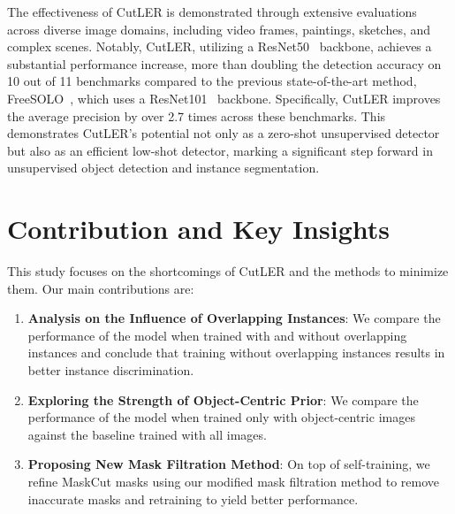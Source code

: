 The effectiveness of CutLER is demonstrated through extensive evaluations across diverse image domains, including video frames, paintings, sketches, and complex scenes. Notably, CutLER, utilizing a ResNet50~\cite{he2015deepresiduallearningimage} backbone, achieves a substantial performance increase, more than doubling the detection accuracy on 10 out of 11 benchmarks compared to the previous state-of-the-art method, FreeSOLO~\cite{wang2022freesolo}, which uses a ResNet101~\cite{he2015deepresiduallearningimage} backbone. Specifically, CutLER improves the average precision by over 2.7 times across these benchmarks. This demonstrates CutLER's potential not only as a zero-shot unsupervised detector but also as an efficient low-shot detector, marking a significant step forward in unsupervised object detection and instance segmentation.

\section{Contribution and Key Insights}

This study focuses on the shortcomings of CutLER and the methods to minimize them. Our main contributions are:

\begin{enumerate}
    
    \item \textbf{Analysis on the Influence of Overlapping Instances}: We compare the performance of the model when trained with and without overlapping instances and conclude that training without overlapping instances results in better instance discrimination.
    
    \item \textbf{Exploring the Strength of Object-Centric Prior}: We compare the performance of the model when trained only with object-centric images against the baseline trained with all images.

    \item \textbf{Proposing New Mask Filtration Method}: On top of self-training, we refine MaskCut masks using our modified mask filtration method to remove inaccurate masks and retraining to yield better performance.
\end{enumerate}

